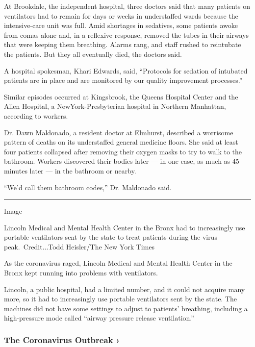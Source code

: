 At Brookdale, the independent hospital, three doctors said that many
patients on ventilators had to remain for days or weeks in understaffed
wards because the intensive-care unit was full. Amid shortages in
sedatives, some patients awoke from comas alone and, in a reflexive
response, removed the tubes in their airways that were keeping them
breathing. Alarms rang, and staff rushed to reintubate the patients. But
they all eventually died, the doctors said.

A hospital spokesman, Khari Edwards, said, ``Protocols for sedation of
intubated patients are in place and are monitored by our quality
improvement processes.''

Similar episodes occurred at Kingsbrook, the Queens Hospital Center and
the Allen Hospital, a NewYork-Presbyterian hospital in Northern
Manhattan, according to workers.

Dr. Dawn Maldonado, a resident doctor at Elmhurst, described a worrisome
pattern of deaths on its understaffed general medicine floors. She said
at least four patients collapsed after removing their oxygen masks to
try to walk to the bathroom. Workers discovered their bodies later ---
in one case, as much as 45 minutes later --- in the bathroom or nearby.

``We'd call them bathroom codes,'' Dr. Maldonado said.

\begin{center}\rule{0.5\linewidth}{\linethickness}\end{center}

Image

Lincoln Medical and Mental Health Center in the Bronx had to
increasingly use portable ventilators sent by the state to treat
patients during the virus peak.~Credit...Todd Heisler/The New York Times

As the coronavirus raged, Lincoln Medical and Mental Health Center in
the Bronx kept running into problems with ventilators.

Lincoln, a public hospital, had a limited number, and it could not
acquire many more, so it had to increasingly use portable ventilators
sent by the state. The machines did not have some settings to adjust to
patients' breathing, including a high-pressure mode called ``airway
pressure release ventilation.''

\href{https://www.nytimes.com/news-event/coronavirus?action=click\&pgtype=Article\&state=default\&region=MAIN_CONTENT_3\&context=storylines_faq}{}

\hypertarget{the-coronavirus-outbreak-}{%
\subsubsection{The Coronavirus Outbreak
›}\label{the-coronavirus-outbreak-}}

